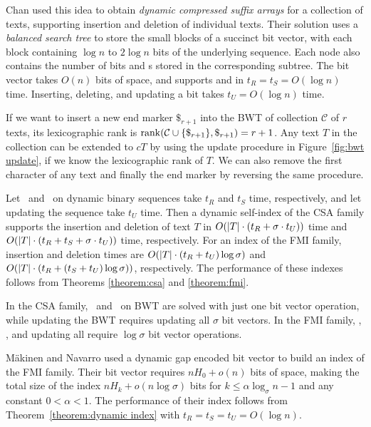Chan  used this idea to obtain \emph{dynamic compressed suffix arrays} for a collection of texts, supporting insertion and deletion of individual texts. Their solution uses a \emph{balanced search tree} to store the small blocks of a succinct bit vector, with each block containing $\log n$ to $2 \log n$ bits of the underlying sequence. Each node also contains the number of bits and \onebit{}s stored in the corresponding subtree. The bit vector takes $O(n)$ bits of space, and supports \rank{} and \select{} in $t_{R} = t_{S} = O(\log n)$ time. Inserting, deleting, and updating a bit takes $t_{U} = O(\log n)$ time.

If we want to insert a new end marker $\$_{r+1}$ into the BWT of collection $\mathcal{C}$ of $r$ texts, its lexicographic rank is $\operatorname{rank}(\mathcal{C} \cup \{ \$_{r+1} \}, \$_{r+1}) = r+1$. Any text $T$ in the collection can be extended to $cT$ by using the update procedure in Figure~\ref{fig:bwt update}, if we know the lexicographic rank of $T$. We can also remove the first character of any text and finally the end marker by reversing the same procedure.

\begin{theorem}\label{theorem:dynamic index}
Let \rank\ and \select\ on dynamic binary sequences take $t_{R}$ and $t_{S}$ time, respectively, and let updating the sequence take $t_{U}$ time. Then a dynamic self-index of the CSA family supports the insertion and deletion of text $T$ in $O(\lvert T \rvert \cdot (t_{R} + \sigma \cdot t_{U}))$ time and $O(\lvert T \rvert \cdot (t_{R} + t_{S} + \sigma \cdot t_{U}))$ time, respectively. For an index of the FMI family, insertion and deletion times are $O(\lvert T \rvert \cdot (t_{R} + t_{U}) \log \sigma)$ and $O(\lvert T \rvert \cdot (t_{R} + (t_{S} + t_{U}) \log \sigma))$, respectively. The performance of these indexes follows from Theorems \ref{theorem:csa} and \ref{theorem:fmi}.
\end{theorem}

In the CSA family, \rank\ and \select\ on BWT are solved with just one bit vector operation, while updating the BWT requires updating all $\sigma$ bit vectors. In the FMI family, \rank, \select, and updating all require $\log \sigma$ bit vector operations.

Mäkinen and Navarro \cite{Maekinen2008a} used a dynamic gap encoded bit vector to build an index of the FMI family. Their bit vector requires $nH_{0} + o(n)$ bits of space, making the total size of the index $nH_{k} + o(n \log \sigma)$ bits for $k \le \alpha \log_{\sigma} n - 1$ and any constant $0 < \alpha < 1$. The performance of their index follows from Theorem~\ref{theorem:dynamic index} with $t_{R} = t_{S} = t_{U} = O(\log n)$.

